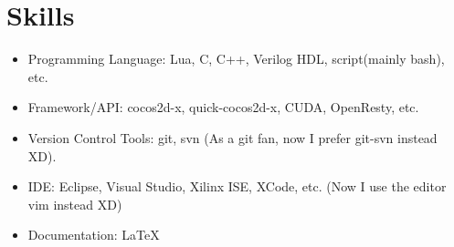 \documentclass[letterpaper]{article}
\begin{document}
\section*{Skills}
\begin{itemize}
    \item Programming Language: Lua, C, C++, Verilog HDL, script(mainly bash), etc.
    \item Framework/API: cocos2d-x, quick-cocos2d-x, CUDA, OpenResty, etc.
    \item Version Control Tools: git, svn (As a git fan, now I prefer git-svn instead XD).
    \item IDE: Eclipse, Visual Studio, Xilinx ISE, XCode, etc. (Now I use the editor vim instead XD)
    \item Documentation: \LaTeX
\end{itemize}
\end{document}
